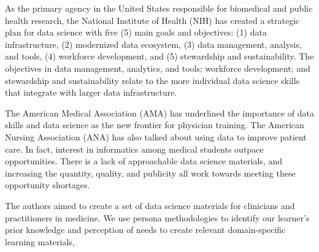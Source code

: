 \documentclass[020-persona\_validation.tex]{subfiles}
\begin{document}

    As the primary agency in the United States responsible for biomedical and public health research,
    the National Institute of Health (NIH) has created a strategic plan for data science with five (5)
    main goals and objectives:
    (1) data infrastructure,
    (2) modernized data ecosystem,
    (3) data management, analysis, and tools,
    (4) workforce development, and
    (5) stewardship and sustainability. %
    The objectives in
    data management, analytics, and tools;
    workforce development;
    and stewardship and sustainability
    relate to the more individual data science skills that integrate with larger data infrastructure.


    The American Medical Association (AMA) has underlined the importance of data skills and data science
    as the new frontier for physician training.
    The American Nursing Association (ANA) has also talked about using data to improve patient care.
    In fact, interest in informatics among medical students outpace opportunities.
    There is a lack of approachable data science materials,
    and increasing the quantity, quality, and publicity all work towards meeting these opportunity shortages.

    The authors aimed to create a set of data science materials for clinicians and practitioners in medicine.
    We use persona methodologies to identify our learner's prior knowledge and perception of needs
    to create relevant domain-specific learning materials,
\end{document}
